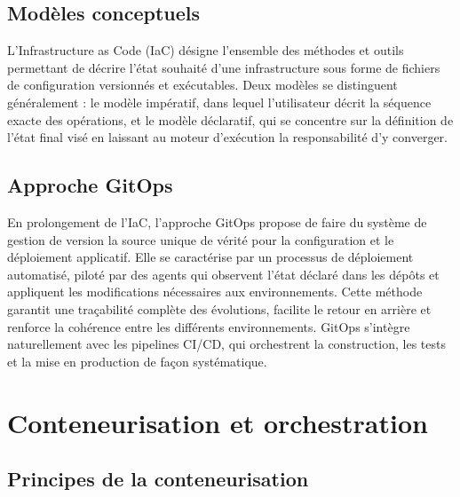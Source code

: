 \subsection{Modèles conceptuels}

L’Infrastructure as Code (IaC) désigne l’ensemble des méthodes et outils permettant de décrire l’état souhaité d’une infrastructure sous forme de fichiers de configuration versionnés et exécutables. Deux modèles se distinguent généralement : le modèle impératif, dans lequel l’utilisateur décrit la séquence exacte des opérations, et le modèle déclaratif, qui se concentre sur la définition de l’état final visé en laissant au moteur d’exécution la responsabilité d’y converger.

\subsection{Approche GitOps}

En prolongement de l’IaC, l’approche GitOps propose de faire du système de gestion de version la source unique de vérité pour la configuration et le déploiement applicatif. Elle se caractérise par un processus de déploiement automatisé, piloté par des agents qui observent l’état déclaré dans les dépôts et appliquent les modifications nécessaires aux environnements. Cette méthode garantit une traçabilité complète des évolutions, facilite le retour en arrière et renforce la cohérence entre les différents environnements. GitOps s’intègre naturellement avec les pipelines CI/CD, qui orchestrent la construction, les tests et la mise en production de façon systématique.

\section{Conteneurisation et orchestration}

\subsection{Principes de la conteneurisation}

